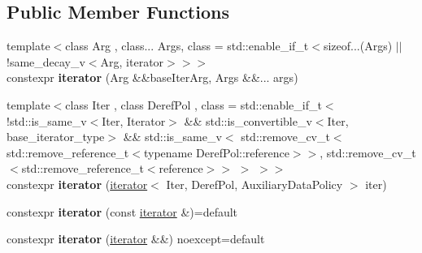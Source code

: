 \subsection*{Public Member Functions}
\begin{DoxyCompactItemize}
\item 
\mbox{\label{classsequoia_1_1utilities_1_1iterator_a7d3f03762aa085afb3a3ef2f0e9530bc}} 
{\footnotesize template$<$class Arg , class... Args, class  = std\+::enable\+\_\+if\+\_\+t$<$sizeof...(\+Args) $\vert$$\vert$ !same\+\_\+decay\+\_\+v$<$\+Arg, iterator$>$$>$$>$ }\\constexpr {\bfseries iterator} (Arg \&\&base\+Iter\+Arg, Args \&\&... args)
\item 
\mbox{\label{classsequoia_1_1utilities_1_1iterator_ae1a24866448637be8904288446877e25}} 
{\footnotesize template$<$class Iter , class Deref\+Pol , class  = std\+::enable\+\_\+if\+\_\+t$<$           !std\+::is\+\_\+same\+\_\+v$<$\+Iter, Iterator$>$        \&\& std\+::is\+\_\+convertible\+\_\+v$<$\+Iter, base\+\_\+iterator\+\_\+type$>$        \&\& std\+::is\+\_\+same\+\_\+v$<$              std\+::remove\+\_\+cv\+\_\+t$<$std\+::remove\+\_\+reference\+\_\+t$<$typename Deref\+Pol\+::reference$>$$>$,              std\+::remove\+\_\+cv\+\_\+t$<$std\+::remove\+\_\+reference\+\_\+t$<$reference$>$$>$           $>$      $>$$>$ }\\constexpr {\bfseries iterator} (\mbox{\hyperlink{classsequoia_1_1utilities_1_1iterator}{iterator}}$<$ Iter, Deref\+Pol, Auxiliary\+Data\+Policy $>$ iter)
\item 
\mbox{\label{classsequoia_1_1utilities_1_1iterator_af3a8732b36d6b9ba6b74494ee3d77c6a}} 
constexpr {\bfseries iterator} (const \mbox{\hyperlink{classsequoia_1_1utilities_1_1iterator}{iterator}} \&)=default
\item 
\mbox{\label{classsequoia_1_1utilities_1_1iterator_a0ad0afd57e63bab2854b8e0c75d75306}} 
constexpr {\bfseries iterator} (\mbox{\hyperlink{classsequoia_1_1utilities_1_1iterator}{iterator}} \&\&) noexcept=default
\item 
\mbox{\label{classsequoia_1_1utilities_1_1iterator_ac1b5b6fb9f031bd189e6580dbb4b4cba}} 

\end{DoxyCompactItemize}
